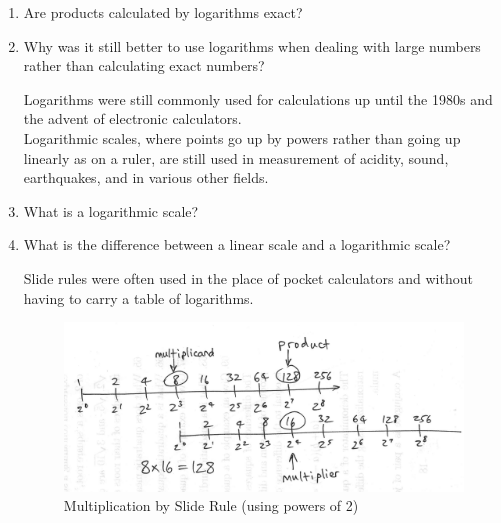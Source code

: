 \documentclass[12pt]{article}
\begin{document}
\begin{enumerate}
\item Are products calculated by logarithms exact?
\item Why was it still better to use logarithms when dealing with large numbers rather than calculating exact numbers?

Logarithms were still commonly used for calculations up until the 1980s and the advent of electronic calculators.\\

Logarithmic scales, where points go up by powers rather than going up linearly as on a ruler, are still used in measurement of acidity, sound, earthquakes, and in various other fields.\\

\begin{figure}[h!]
\centering
{}
\end{figure}

\item What is a logarithmic scale?
\item What is the difference between a linear scale and a logarithmic scale?

Slide rules were often used in the place of pocket calculators and without having to carry a table of logarithms.\\

\begin{figure}[h!]
\centering
\includegraphics[width=\linewidth]{slide rule drawing.jpeg}
    \caption*{Multiplication by Slide Rule (using powers of 2)}
\end{figure}


\end{enumerate}
\end{document}
